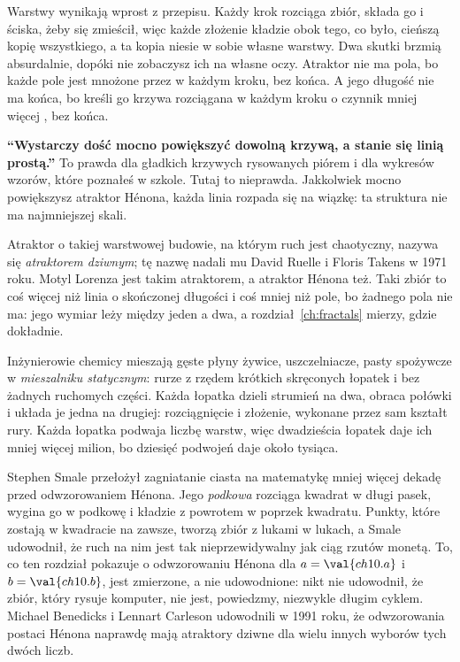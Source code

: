 \noindent
Warstwy wynikają wprost z przepisu. Każdy krok rozciąga zbiór, składa go i
ściska, żeby się zmieścił, więc każde złożenie kładzie obok tego, co było,
cieńszą kopię wszystkiego, a ta kopia niesie w sobie własne warstwy. Dwa
skutki brzmią absurdalnie, dopóki nie zobaczysz ich na własne oczy. Atraktor
nie ma pola, bo każde pole jest mnożone przez  w każdym kroku,
bez końca. A jego długość nie ma końca, bo kreśli go krzywa rozciągana w
każdym kroku o czynnik mniej więcej , bez końca.

\begin{trapbox}
\textbf{\enquote{Wystarczy dość mocno powiększyć dowolną krzywą, a stanie się
linią prostą.}} To prawda dla gładkich krzywych rysowanych piórem i dla
wykresów wzorów, które poznałeś w szkole. Tutaj to nieprawda. Jakkolwiek
mocno powiększysz atraktor Hénona, każda linia rozpada się na wiązkę: ta
struktura nie ma najmniejszej skali.
\end{trapbox}

\noindent
Atraktor o takiej warstwowej budowie, na którym ruch jest chaotyczny, nazywa
się \emph{atraktorem dziwnym}; tę nazwę nadali mu David Ruelle i Floris
Takens w 1971 roku. Motyl Lorenza jest takim atraktorem, a atraktor Hénona
też. Taki zbiór to coś więcej niż linia o skończonej długości i coś
mniej niż pole, bo żadnego pola nie ma: jego wymiar leży między jeden
a dwa, a rozdział~\ref{ch:fractals} mierzy, gdzie dokładnie.

\begin{worldbox}
Inżynierowie chemicy mieszają gęste płyny \dash{} żywice, uszczelniacze,
pasty spożywcze \dash{} w \emph{mieszalniku statycznym}: rurze z rzędem
krótkich skręconych łopatek i bez żadnych ruchomych części. Każda łopatka
dzieli strumień na dwa, obraca połówki i układa je jedna na drugiej:
rozciągnięcie i złożenie, wykonane przez sam kształt rury. Każda łopatka
podwaja liczbę warstw, więc dwadzieścia łopatek daje ich mniej więcej milion,
bo dziesięć podwojeń daje około tysiąca.
\end{worldbox}

\begin{rigourbox}
Stephen Smale przełożył zagniatanie ciasta na matematykę mniej więcej dekadę
przed odwzorowaniem Hénona. Jego \emph{podkowa} rozciąga kwadrat w długi
pasek, wygina go w podkowę i kładzie z powrotem w poprzek kwadratu. Punkty,
które zostają w kwadracie na zawsze, tworzą zbiór z lukami w lukach, a Smale
udowodnił, że ruch na nim jest tak nieprzewidywalny jak ciąg rzutów monetą.
To, co ten rozdział pokazuje o odwzorowaniu Hénona dla $a = \val{ch10.a}$ i
$b = \val{ch10.b}$, jest zmierzone, a nie udowodnione: nikt nie udowodnił, że
zbiór, który rysuje komputer, nie jest, powiedzmy, niezwykle długim cyklem.
Michael Benedicks i Lennart Carleson udowodnili w 1991 roku, że odwzorowania
postaci Hénona naprawdę mają atraktory dziwne dla wielu innych wyborów tych
dwóch liczb.
\end{rigourbox}

